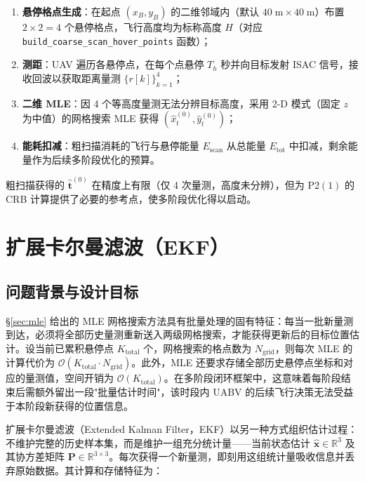 \begin{enumerate}
    \item \textbf{悬停格点生成}：在起点 $(x_B,y_B)$ 的二维邻域内（默认 $40\;\mathrm{m}\times 40\;\mathrm{m}$）布置 $2\times 2=4$ 个悬停格点，飞行高度均为标称高度 $H$（对应 \texttt{build\_coarse\_scan\_hover\_points} 函数）；
    \item \textbf{测距}：UAV 遍历各悬停点，在每个点悬停 $T_h$ 秒并向目标发射 ISAC 信号，接收回波以获取距离量测 $\{r[k]\}_{k=1}^{4}$；
    \item \textbf{二维 MLE}：因 4 个等高度量测无法分辨目标高度，采用 2-D 模式（固定 $z$ 为中值）的网格搜索 MLE 获得 $(\hat{x}_t^{(0)},\hat{y}_t^{(0)})$；
    \item \textbf{能耗扣减}：粗扫描消耗的飞行与悬停能量 $E_{\mathrm{scan}}$ 从总能量 $E_{\mathrm{tot}}$ 中扣减，剩余能量作为后续多阶段优化的预算。
\end{enumerate}

粗扫描获得的 $\hat{\mathbf{t}}^{(0)}$ 在精度上有限（仅 4 次量测，高度未分辨），但为 P2$(1)$ 的 CRB 计算提供了必要的参考点，使多阶段优化得以启动。


\section{扩展卡尔曼滤波（EKF）}
\label{sec:ekf}

\subsection{问题背景与设计目标}

\S\ref{sec:mle} 给出的 MLE 网格搜索方法具有批量处理的固有特征：每当一批新量测到达，必须将全部历史量测重新送入两级网格搜索，才能获得更新后的目标位置估计。设当前已累积悬停点 $K_{\text{total}}$ 个，网格搜索的格点数为 $N_{\text{grid}}$，则每次 MLE 的计算代价为 $\mathcal{O}(K_{\text{total}} \cdot N_{\text{grid}})$。此外，MLE 还要求存储全部历史悬停点坐标和对应的量测值，空间开销为 $\mathcal{O}(K_{\text{total}})$。在多阶段闭环框架中，这意味着每阶段结束后需额外留出一段"批量估计时间"，该时段内 UABV 的后续飞行决策无法受益于本阶段新获得的位置信息。

扩展卡尔曼滤波（Extended Kalman Filter，EKF）以另一种方式组织估计过程：不维护完整的历史样本集，而是维护一组充分统计量——当前状态估计 $\hat{\mathbf{x}} \in \mathbb{R}^3$ 及其协方差矩阵 $\mathbf{P} \in \mathbb{R}^{3 \times 3}$。每次获得一个新量测，即刻用这组统计量吸收信息并丢弃原始数据。其计算和存储特征为：

